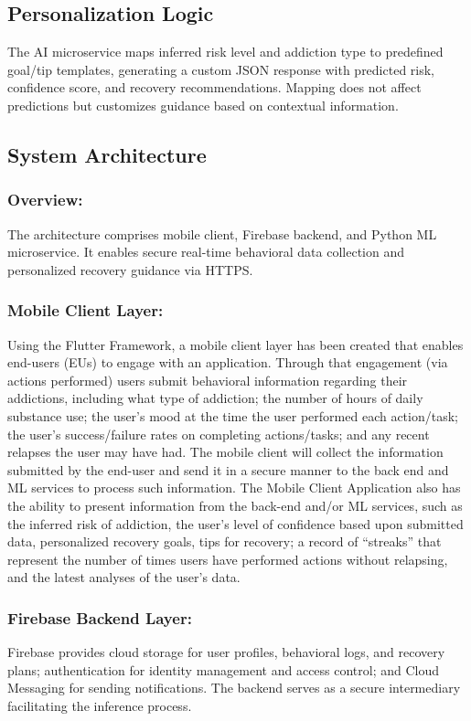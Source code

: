 \documentclass[a4paper]{article}
\begin{document}
\subsection{Personalization Logic}
The AI microservice maps inferred risk level and addiction type to predefined goal/tip templates, generating a custom JSON response with predicted risk, confidence score, and recovery recommendations. Mapping does not affect predictions but customizes guidance based on contextual information.


\subsection{System Architecture}

\subsubsection{Overview:}
The architecture comprises mobile client, Firebase backend, and Python ML microservice. It enables secure real-time behavioral data collection and personalized recovery guidance via HTTPS.

\subsubsection{Mobile Client Layer:}
Using the Flutter Framework, a mobile client layer has been created that enables end-users (EUs) to engage with an application. Through that engagement (via actions performed) users submit behavioral information regarding their addictions, including what type of addiction; the number of hours of daily substance use; the user's mood at the time the user performed each action/task; the user's success/failure rates on completing actions/tasks; and any recent relapses the user may have had. The mobile client will collect the information submitted by the end-user and send it in a secure manner to the back end and ML services to process such information. The Mobile Client Application also has the ability to present information from the back-end and/or ML services, such as the inferred risk of addiction, the user's level of confidence based upon submitted data, personalized recovery goals, tips for recovery; a record of “streaks” that represent the number of times users have performed actions without relapsing, and the latest analyses of the user's data.

\subsubsection{Firebase Backend Layer:}
Firebase provides cloud storage for user profiles, behavioral logs, and recovery plans; authentication for identity management and access control; and Cloud Messaging for sending notifications. The backend serves as a secure intermediary facilitating the inference process.
\end{document}
